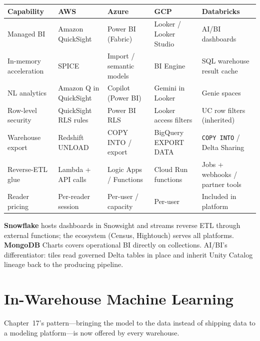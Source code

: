 \begin{center}
\footnotesize
\begin{tabular}{@{}p{2.4cm}p{2.9cm}p{2.9cm}p{2.9cm}p{2.9cm}@{}}
\toprule
\textbf{Capability} & \textbf{AWS} & \textbf{Azure} & \textbf{GCP} & \textbf{Databricks} \\
\midrule
Managed BI & Amazon QuickSight & Power BI (Fabric) & Looker / Looker Studio & AI/BI dashboards \\
In-memory acceleration & SPICE & Import / semantic models & BI Engine & SQL warehouse result cache \\
NL analytics & Amazon Q in QuickSight & Copilot (Power BI) & Gemini in Looker & Genie spaces \\
Row-level security & QuickSight RLS rules & Power BI RLS & Looker access filters & UC row filters (inherited) \\
Warehouse export & Redshift UNLOAD & COPY INTO / export & BigQuery EXPORT DATA & \texttt{COPY INTO} / Delta Sharing \\
Reverse-ETL glue & Lambda + API calls & Logic Apps / Functions & Cloud Run functions & Jobs + webhooks / partner tools \\
\addlinespace
Reader pricing & Per-reader session & Per-user / capacity & Per-user & Included in platform \\
\bottomrule
\end{tabular}
\end{center}

\noindent \textbf{Snowflake} hosts dashboards in Snowsight and streams reverse ETL through
external functions; the ecosystem (Census, Hightouch) serves all platforms. \textbf{MongoDB}
Charts covers operational BI directly on collections. AI/BI's differentiator: tiles read governed
Delta tables in place and inherit Unity Catalog lineage back to the producing pipeline.

\section{In-Warehouse Machine Learning}
%
Chapter~17's pattern---bringing the model to the data instead of shipping data to a modeling
platform---is now offered by every warehouse.

